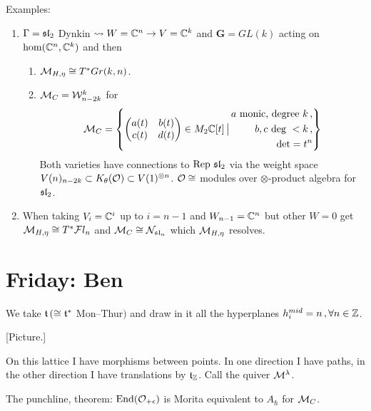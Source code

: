 \begin{enumerate}
    Examples: \begin{enumerate}
        \item $\Gamma = \sl_2$ Dynkin $\rightsquigarrow W = \C^n\rightarrow V = \C^k$ and $\mathbf{G} = GL(k)$ acting on $\hom(\C^n,\C^k)$ and then \begin{enumerate}
            \item $\M_{H,\eta}\cong T^\ast Gr(k,n)$. 
            \item $\M_C= \W^k_{n-2k}$ for $$\M_C = \left\{  
                \begin{pmatrix} a(t) & b(t) \\ c(t) & d(t) \end{pmatrix} \in M_2 \C[t] \st \begin{aligned} a \textrm{ monic, degree }k\,, \\ b,c \textrm{ deg }<k\,, \\ \det = t^n \end{aligned}   
            \right\} $$ 
            Both varieties have connections to $\Rep \sl_2$ via the weight space $V(n)_{n-2k}\subset K_\theta (\OO)\subset V(1)^{\otimes n}$. $\OO\cong$ modules over $\otimes$-product algebra for $\sl_2$.  
        \end{enumerate}  
        \item When taking $V_i = \C^i$ up to $i = n-1$ and $W_{n-1} = \C^n$ but other $W = 0$ get $\M_{H,\eta} \cong T^\ast \fl_n$ and $\M_C\cong \mathcal{N}_{\sl_n}$ which $\M_{H,\eta}$ resolves. 
    \end{enumerate}
\end{enumerate} 

\section{Friday: Ben}

We take $\tt\, (\cong \tt^\ast $ Mon--Thur$)$ and draw in it all the hyperplanes $h_i^{mid} = n\,,\forall n\in\Z$. 

[Picture.] 

On this lattice I have morphisms between points. In one direction I have paths, in the other direction I have translations by $\tt_\Z$. Call the quiver $\M^\lambda$.

The punchline, theorem: $\End(\OO_{+\epsilon})$ is Morita equivalent to $A_\hbar$ for $\M_C$. 


